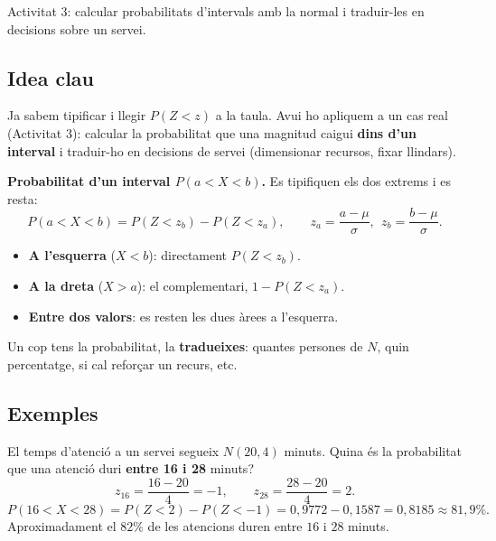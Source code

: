 %
{Activitat 3: calcular probabilitats d'intervals amb la normal i traduir-les en decisions sobre un servei.}

\subsection{Idea clau}

Ja sabem tipificar i llegir $P(Z<z)$ a la taula. Avui ho apliquem a un cas real
(Activitat 3): calcular la probabilitat que una magnitud caigui \textbf{dins d'un
interval} i traduir-ho en decisions de servei (dimensionar recursos, fixar llindars).

\begin{idea}
\textbf{Probabilitat d'un interval $P(a<X<b)$.} Es tipifiquen els dos extrems i es resta:
\[
P(a<X<b)=P(Z<z_b)-P(Z<z_a),\qquad z_a=\frac{a-\mu}{\sigma},\ \ z_b=\frac{b-\mu}{\sigma}.
\]
\begin{itemize}[leftmargin=1.4em, itemsep=2pt]
  \item \textbf{A l'esquerra} ($X<b$): directament $P(Z<z_b)$.
  \item \textbf{A la dreta} ($X>a$): el complementari, $1-P(Z<z_a)$.
  \item \textbf{Entre dos valors}: es resten les dues àrees a l'esquerra.
\end{itemize}
Un cop tens la probabilitat, la \textbf{tradueixes}: quantes persones de $N$, quin
percentatge, si cal reforçar un recurs, etc.
\end{idea}

\subsection{Exemples}

\begin{exemple}
El temps d'atenció a un servei segueix $N(20,4)$ minuts. Quina és la probabilitat que una
atenció duri \textbf{entre 16 i 28} minuts?
\[
z_{16}=\frac{16-20}{4}=-1,\qquad z_{28}=\frac{28-20}{4}=2.
\]
\[
P(16<X<28)=P(Z<2)-P(Z<-1)=0,9772-0,1587=0,8185\approx 81,9\%.
\]
Aproximadament el $82\%$ de les atencions duren entre $16$ i $28$ minuts.
\end{exemple}

